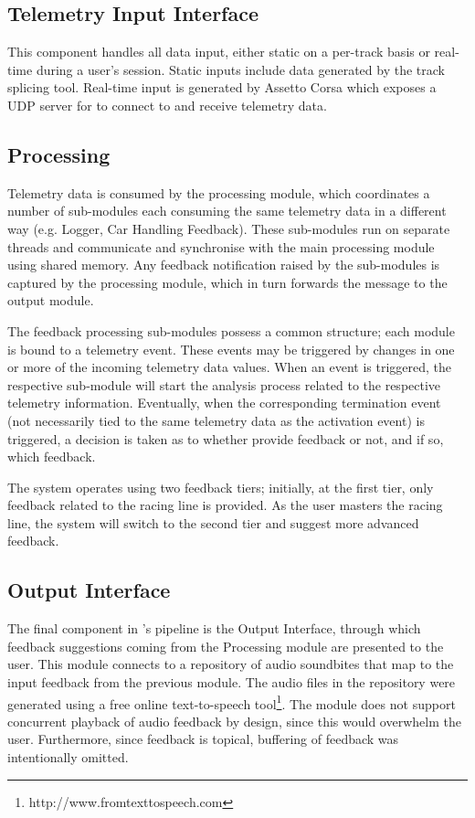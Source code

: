 \documentclass{sig-alternate}
\begin{document}
{\subsection{Telemetry Input Interface}
This component handles all data input, either static on a per-track basis or real-time during a user's session. Static inputs include data generated by the track splicing tool. Real-time input is generated by Assetto Corsa which exposes a UDP server for \methodname to connect to and receive telemetry data.

\subsection{Processing}
Telemetry data is consumed by the processing module, which coordinates a number of sub-modules each consuming the same telemetry data in a different way (e.g. Logger, Car Handling Feedback). These sub-modules run on separate threads and communicate and synchronise with the main processing module using shared memory. Any feedback notification raised by the sub-modules is captured by the processing module, which in turn forwards the message to the output module.

The feedback processing sub-modules possess a common structure; each module is bound to a telemetry event. These events may be triggered by changes in one or more of the incoming telemetry data values. When an event is triggered, the respective sub-module will start the analysis process related to the respective telemetry information. Eventually, when the corresponding termination event (not necessarily tied to the same telemetry data as the activation event) is triggered, a decision is taken as to whether provide feedback or not, and if so, which feedback.

The system operates using two feedback tiers; initially, at the first tier, only feedback related to the racing line is provided. As the user masters the racing line, the system will switch to the second tier and suggest more advanced feedback.

\subsection{Output Interface}
The final component in \methodname's pipeline is the Output Interface, through which feedback suggestions coming from the Processing module are presented to the user. This module connects to a repository of audio soundbites that map to the input feedback from the previous module. The audio files in the repository were generated using a free online text-to-speech tool\footnote{http://www.fromtexttospeech.com}. The module does not support concurrent playback of audio feedback by design, since this would overwhelm the user. Furthermore, since feedback is topical, buffering of feedback was intentionally omitted.

}
\end{document}
